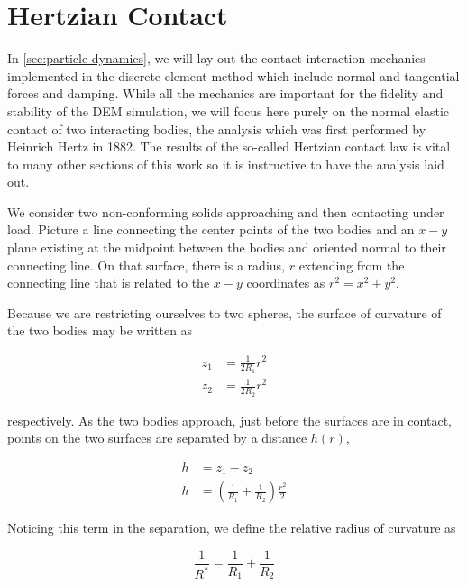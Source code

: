 \chapter{Hertzian Contact} \label{sec:hertz-theory}

In \cref{sec:particle-dynamics}, we will lay out the contact interaction mechanics implemented in the discrete element method which include normal and tangential forces and damping. While all the mechanics are important for the fidelity and stability of the DEM simulation, we will focus here purely on the normal elastic contact of two interacting bodies, the analysis which was first performed by Heinrich Hertz in 1882. The results of the so-called Hertzian contact law is vital to many other sections of this work so it is instructive to have the analysis laid out.

We consider two non-conforming solids approaching and then contacting under load. Picture a line connecting the center points of the two bodies and an $x-y$ plane existing at the midpoint between the bodies and oriented normal to their connecting line. On that surface, there is a radius, $r$ extending from the connecting line that is related to the $x-y$ coordinates as $r^2 = x^2 + y^2$.

Because we are restricting ourselves to two spheres, the surface of curvature of the two bodies may be written as

\begin{subequations}
\begin{align}
z_1 &= \frac{1}{2R_1}r^2 \\
z_2 &= \frac{1}{2R_2}r^2
\end{align}
\end{subequations}

respectively. As the two bodies approach, just before the surfaces are in contact, points on the two surfaces are separated by a distance $h(r)$,

\begin{align}\label{eq:separationh}
h &= z_1 - z_2 \nonumber \\
h & = \left(\frac{1}{R_1} + \frac{1}{R_2}\right)\frac{r^2}{2} 
\end{align}

Noticing this term in the separation, we define the relative radius of curvature as

\begin{equation}\label{eq:relativeRadius}
\frac{1}{R^*} = \frac{1}{R_1} + \frac{1}{R_2}
\end{equation}

